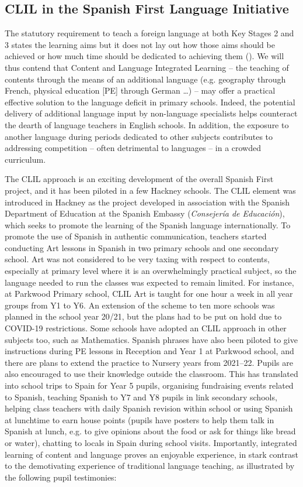 \documentclass[output=paper]{langscibook}
\begin{document}
\subsection{CLIL in the Spanish First Language Initiative}

The statutory requirement to teach a foreign language at both Key Stages 2 and 3 states the learning aims but it does not lay out how those aims should be achieved or how much time should be dedicated to achieving them (\citealt{DfE2013key}). We will thus contend that Content and Language Integrated Learning -- the teaching of contents through the means of an additional language (e.g. geography through French, physical education [PE] through German \ldots) -- may offer a practical effective solution to the language deficit in primary schools. Indeed, the potential delivery of additional language input by non-language specialists helps counteract the dearth of language teachers in English schools. In addition, the exposure to another language during periods dedicated to other subjects contributes to addressing competition -- often detrimental to languages -- in a crowded curriculum.

The CLIL approach is an exciting development of the overall Spanish First project, and it has been piloted in a few Hackney schools. The CLIL element was introduced in Hackney as the project developed in association with the Spanish Department of Education at the Spanish Embassy (\textit{Consejería de Educación}), which seeks to promote the learning of the Spanish language internationally. To promote the use of Spanish in authentic communication, teachers started conducting Art lessons in Spanish in two primary schools and one secondary school. Art was not considered to be very taxing with respect to contents, especially at primary level where it is an overwhelmingly practical subject, so the language needed to run the classes was expected to remain limited. For instance, at Parkwood Primary school, CLIL Art is taught for one hour a week in all year groups from Y1 to Y6. An extension of the scheme to ten more schools was planned in the school year 20/21, but the plans had to be put on hold due to COVID-19 restrictions. Some schools have adopted an CLIL approach in other subjects too, such as Mathematics. Spanish phrases have also been piloted to give instructions during PE lessons in Reception and Year 1 at Parkwood school, and there are plans to extend the practice to Nursery years from 2021--22. Pupils are also encouraged to use their knowledge outside the classroom. This has translated into school trips to Spain for Year 5 pupils, organising fundraising events related to Spanish, teaching Spanish to Y7 and Y8 pupils in link secondary schools, helping class teachers with daily Spanish revision within school or using Spanish at lunchtime to earn house points (pupils have posters to help them talk in Spanish at lunch, e.g. to give opinions about the food or ask for things like bread or water), chatting to locals in Spain during school visits. Importantly, integrated learning of content and language proves an enjoyable experience, in stark contrast to the demotivating experience of traditional language teaching, as illustrated by the following pupil testimonies:\largerpage
\end{document}
